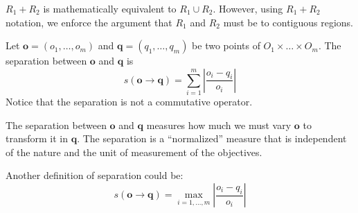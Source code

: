 \begin{remark}
$R_{1}+R_{2}$ is mathematically equivalent to $R_{1}\cup R_{2}$.
However, using $R_{1}+R_{2}$ notation, we enforce the argument that
$R_{1}$ and $R_{2}$ must be to contiguous regions.
\end{remark}

\begin{definition}[Separation]Let $\mathbf{o}=\left(o_{1},\dots,o_{m}\right)$ and $\mathbf{q}=\left(q_{1},\dots,q_{m}\right)$
be two points of $O_{1}\times\dots\times O_{m}$. The separation between
$\mathbf{o}$ and $\mathbf{q}$ is 
\[
s\left(\mathbf{o}\rightarrow\mathbf{q}\right)=\sum_{i=1}^{m}\left|\frac{o_{i}-q_{i}}{o_{i}}\right|
\]
Notice that the separation is not a commutative operator.
\end{definition}

\begin{remark}
The separation between $\mathbf{o}$ and $\mathbf{q}$ measures how
much we must vary $\mathbf{o}$ to transform it in $\mathbf{q}$.
The separation is a ``normalized'' measure that is independent of
the nature and the unit of measurement of the objectives.
\end{remark}

\begin{definition} Another definition of separation could be:
\[
s\left(\mathbf{o}\rightarrow\mathbf{q}\right)=\max_{i=1,\dots,m}\left|\frac{o_{i}-q_{i}}{o_{i}}\right|
\]

\end{definition}

